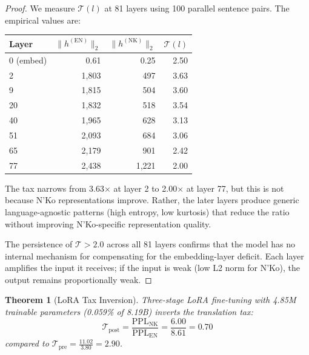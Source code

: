 \documentclass[11pt]{article}
\newtheorem{theorem}{Theorem}
\theoremstyle{remark}
\begin{document}
\begin{proof}
We measure $\mathcal{T}(l)$ at 81 layers using 100 parallel sentence pairs. The empirical values are:

\begin{center}
\begin{tabular}{lrrr}
\toprule
Layer & $\|h^{(\text{EN})}\|_2$ & $\|h^{(\text{NK})}\|_2$ & $\mathcal{T}(l)$ \\
\midrule
0 (embed) & 0.61 & 0.25 & 2.50 \\
2 & 1,803 & 497 & 3.63 \\
9 & 1,815 & 504 & 3.60 \\
20 & 1,832 & 518 & 3.54 \\
40 & 1,965 & 628 & 3.13 \\
51 & 2,093 & 684 & 3.06 \\
65 & 2,179 & 901 & 2.42 \\
77 & 2,438 & 1,221 & 2.00 \\
\bottomrule
\end{tabular}
\end{center}

The tax narrows from 3.63$\times$ at layer 2 to 2.00$\times$ at layer 77, but this is not because N'Ko representations improve. Rather, the later layers produce generic language-agnostic patterns (high entropy, low kurtosis) that reduce the ratio without improving N'Ko-specific representation quality.

The persistence of $\mathcal{T} > 2.0$ across all 81 layers confirms that the model has no internal mechanism for compensating for the embedding-layer deficit. Each layer amplifies the input it receives; if the input is weak (low L2 norm for N'Ko), the output remains proportionally weak.
\end{proof}

\begin{theorem}[LoRA Tax Inversion]
Three-stage LoRA fine-tuning with 4.85M trainable parameters (0.059\% of 8.19B) inverts the translation tax:
$$\mathcal{T}_{\text{post}} = \frac{\text{PPL}_{\text{NK}}}{\text{PPL}_{\text{EN}}} = \frac{6.00}{8.61} = 0.70$$
compared to $\mathcal{T}_{\text{pre}} = \frac{11.02}{3.80} = 2.90$.
\end{theorem}
\end{document}
